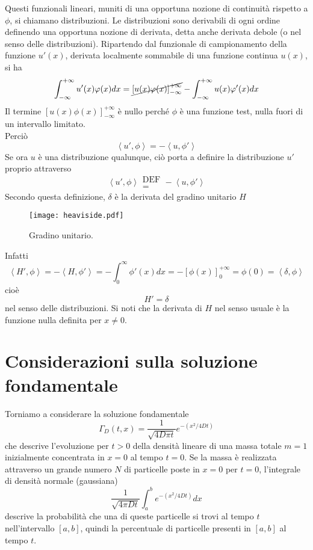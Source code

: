 Questi funzionali lineari, muniti di una opportuna nozione di continuit\`a
rispetto a $\phi$, si chiamano distribuzioni. Le distribuzioni sono
derivabili di ogni ordine definendo una opportuna nozione di derivata,
detta anche derivata debole (o nel senso delle distribuzioni).
Ripartendo dal funzionale di campionamento della funzione $u'(x)$, derivata
localmente sommabile di una funzione continua $u(x)$, si ha
\[
	\int_{- \infty}^{+ \infty} u'(x)\varphi(x) dx= \cancel{\left[ u(x)\varphi(x) \right]^
	{+\infty}_{-\infty}}- \int_{- \infty}^{+ \infty} u(x)\varphi ' (x) dx
\]
Il termine $\left[ u(x)\phi(x) \right]^{+\infty}_{-\infty}$ \`e nullo perch\'e
$\phi$ \`e una funzione test, nulla fuori di un intervallo limitato.\\
Perci\`o
\[
	\left< u', \phi \right>= - \left< u, \phi ' \right>
\]
Se ora $u$ \`e una distribuzione qualunque, ci\`o porta a definire la
distribuzione $u'$ proprio attraverso
\[
	\left< u', \phi \right>\substack{\text{DEF} \\ =} - \left< u, \phi '
\right>
\]
Secondo questa definizione, $\delta$ \`e la derivata del gradino unitario $H$
\begin{figure}[H]
	\centering
	\texttt{[image: heaviside.pdf]}
	\caption{Gradino unitario.}
	\label{heaviside}
\end{figure}
\noindent
Infatti
\[
	\left< H', \phi \right>= - \left< H, \phi ' \right>
	=- \int_0^{\infty} \phi'(x) dx
	=- \left[ \phi (x) \right]^{+ \infty}_{0}
	= \phi(0)= \left< \delta, \phi \right>
\]
cio\`e
\[
	H'=\delta
\]
nel senso delle distribuzioni.
Si noti che la derivata di $H$ nel senso usuale \`e la funzione nulla definita
per $x \neq 0$.
\section{Considerazioni sulla soluzione fondamentale}
Torniamo a considerare la soluzione fondamentale
\[
	\Gamma_D(t,x)= \frac{1}{\sqrt{4D\pi t}}
	e^{-\left( x^2/4Dt \right)}
\]
che descrive l'evoluzione per $t>0$ della densit\`a lineare di una massa totale
$m=1$ inizialmente concentrata in $x=0$ al tempo $t=0$.
Se la massa \`e realizzata attraverso un grande numero $N$ di particelle poste
in $x=0$ per $t=0$, l'integrale di densit\`a normale (gaussiana)
\[
	\frac{1}{\sqrt{4 \pi D t}}\int_a^b
	e^{-\left( x^2/4Dt \right)} dx
\]
descrive la probabilit\`a che una di queste particelle si trovi al tempo $t$
nell'intervallo $[a,b]$, quindi la percentuale di particelle presenti in $[a,b]$
al tempo $t$.

